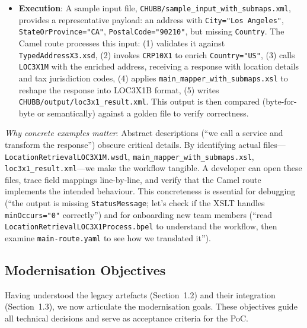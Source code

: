 \documentclass[11pt]{article}
\begin{document}
\begin{itemize}
  \item \textbf{Execution}: A sample input file, \texttt{CHUBB/sample\_input\_with\_submaps.xml}, provides a representative payload: an address with \texttt{City="Los Angeles"}, \texttt{StateOrProvince="CA"}, \texttt{PostalCode="90210"}, but missing \texttt{Country}. The Camel route processes this input: (1) validates it against \texttt{TypedAddressX3.xsd}, (2) invokes \texttt{CRP10X1} to enrich \texttt{Country="US"}, (3) calls \texttt{LOC3X1M} with the enriched address, receiving a response with location details and tax jurisdiction codes, (4) applies \texttt{main\_mapper\_with\_submaps.xsl} to reshape the response into LOC3X1B format, (5) writes \texttt{CHUBB/output/loc3x1\_result.xml}. This output is then compared (byte-for-byte or semantically) against a golden file to verify correctness.
\end{itemize}

\noindent\emph{Why concrete examples matter}: Abstract descriptions (``we call a service and transform the response'') obscure critical details. By identifying actual files—\texttt{LocationRetrievalLOC3X1M.wsdl}, \texttt{main\_mapper\_with\_submaps.xsl}, \texttt{loc3x1\_result.xml}—we make the workflow tangible. A developer can open these files, trace field mappings line-by-line, and verify that the Camel route implements the intended behaviour. This concreteness is essential for debugging (``the output is missing \texttt{StatusMessage}; let's check if the XSLT handles \texttt{minOccurs="0"} correctly'') and for onboarding new team members (``read \texttt{LocationRetrievalLOC3X1Process.bpel} to understand the workflow, then examine \texttt{main-route.yaml} to see how we translated it'').

\subsection{Modernisation Objectives}

Having understood the legacy artefacts (Section~1.2) and their integration (Section~1.3), we now articulate the modernisation goals. These objectives guide all technical decisions and serve as acceptance criteria for the PoC.
\end{document}
